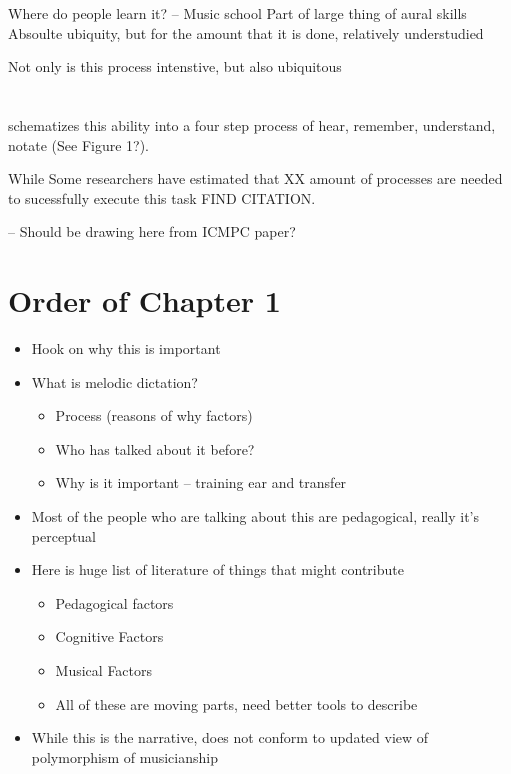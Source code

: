 \documentclass[]{book}
\providecommand{\tightlist}{%
  \setlength{\itemsep}{0pt}\setlength{\parskip}{0pt}}
\theoremstyle{definition}
\theoremstyle{definition}
\theoremstyle{definition}
\theoremstyle{remark}
\begin{document}
Where do people learn it? -- Music school Part of large thing of aural
skills Absoulte ubiquity, but for the amount that it is done, relatively
understudied

Not only is this process intenstive, but also ubiquitous

\hypertarget{section}{%
\section{}\label{section}}

\citet{karpinskiAuralSkillsAcquisition2000} schematizes this ability
into a four step process of hear, remember, understand, notate (See
Figure 1?).

While Some researchers have estimated that XX amount of processes are
needed to sucessfully execute this task FIND CITATION.

-- Should be drawing here from ICMPC paper?

\hypertarget{order-of-chapter-1}{%
\section{Order of Chapter 1}\label{order-of-chapter-1}}

\begin{itemize}
\tightlist
\item
  Hook on why this is important
\item
  What is melodic dictation?

  \begin{itemize}
  \tightlist
  \item
    Process (reasons of why factors)
  \item
    Who has talked about it before?
  \item
    Why is it important -- training ear and transfer
  \end{itemize}
\item
  Most of the people who are talking about this are pedagogical, really
  it's perceptual
\item
  Here is huge list of literature of things that might contribute

  \begin{itemize}
  \tightlist
  \item
    Pedagogical factors
  \item
    Cognitive Factors
  \item
    Musical Factors
  \item
    All of these are moving parts, need better tools to describe
  \end{itemize}
\item
  While this is the narrative, does not conform to updated view of
  polymorphism of musicianship
\end{itemize}
\end{document}
